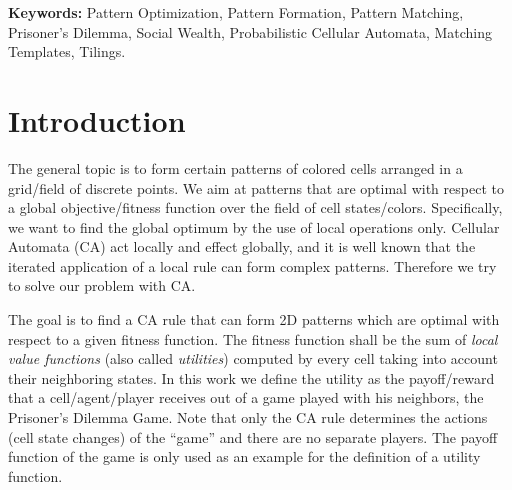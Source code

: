 \documentclass[10pt,a4paper]{article}  %
\begin{document}
\small
\noindent\textbf{Keywords:} Pattern Optimization, Pattern Formation, Pattern Matching, Prisoner’s Dilemma, Social Wealth, Probabilistic Cellular Automata, Matching Templates, Tilings.
\normalsize
%

%
\newpage
\tableofcontents
\newpage


\section{Introduction}

The general topic is to form certain patterns of colored cells arranged in a grid/field of discrete points. 
We aim at patterns that are optimal with respect to a global objective/fitness function over the field of cell states/colors.
Specifically, we want to find the global optimum by the use of local operations only. 
Cellular Automata (CA) act locally and effect globally, 
and it is well known that the iterated application of a local rule can form complex patterns. 
Therefore we try to solve our problem with CA.  

The goal is to find a CA rule that can form  2D patterns 
which are optimal with respect to a given  fitness function.
The fitness function shall be the sum of \textit{local value functions} (also called \textit{utilities}) computed by every cell taking into account their neighboring states.
In this work we define the utility as the payoff/reward 
that a cell/agent/player receives out of a game played with his neighbors,
the Prisoner's Dilemma Game. 
Note that only the CA rule determines the actions (cell state changes) of the
``game'' and there are no separate players.
The payoff function of the game is only used as an example for the definition of a
utility function. 
\end{document}
